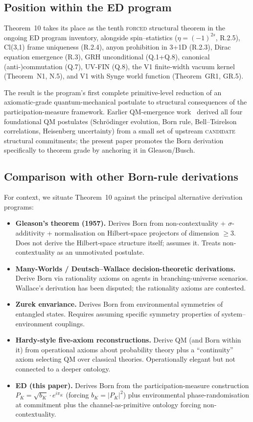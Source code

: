 \documentclass[11pt,a4paper]{article}
\begin{document}
\subsection{Position within the ED program}

Theorem~10 takes its place as the tenth \textsc{forced} structural theorem in the ongoing ED program inventory, alongside spin--statistics ($\eta = (-1)^{2s}$, R.2.5), Cl(3,1) frame uniqueness (R.2.4), anyon prohibition in 3+1D (R.2.3), Dirac equation emergence (R.3), GRH unconditional (Q.1+Q.8), canonical (anti-)commutation (Q.7), UV-FIN (Q.8), the V1 finite-width vacuum kernel (Theorem~N1, N.5), and V1 with Synge world function (Theorem~GR1, GR.5).

The result is the program's first complete primitive-level reduction of an axiomatic-grade quantum-mechanical postulate to structural consequences of the participation-measure framework. Earlier QM-emergence work~\cite{phase1} derived all four foundational QM postulates (Schr\"odinger evolution, Born rule, Bell--Tsirelson correlations, Heisenberg uncertainty) from a small set of upstream \textsc{candidate} structural commitments; the present paper promotes the Born derivation specifically to theorem grade by anchoring it in Gleason/Busch.

\subsection{Comparison with other Born-rule derivations}

For context, we situate Theorem~10 against the principal alternative derivation programs:

\begin{itemize}
  \item \textbf{Gleason's theorem (1957).} Derives Born from non-contextuality + $\sigma$-additivity + normalisation on Hilbert-space projectors of dimension $\geq 3$. Does not derive the Hilbert-space structure itself; assumes it. Treats non-contextuality as an unmotivated postulate.
  \item \textbf{Many-Worlds / Deutsch--Wallace decision-theoretic derivations.} Derive Born via rationality axioms on agents in branching-universe scenarios. Wallace's derivation has been disputed; the rationality axioms are contested.
  \item \textbf{Zurek envariance.} Derives Born from environmental symmetries of entangled states. Requires assuming specific symmetry properties of system--environment couplings.
  \item \textbf{Hardy-style five-axiom reconstructions.} Derive QM (and Born within it) from operational axioms about probability theory plus a ``continuity'' axiom selecting QM over classical theories. Operationally elegant but not connected to a deeper ontology.
  \item \textbf{ED (this paper).} Derives Born from the participation-measure construction $P_K = \sqrt{b_K} \cdot e^{i \pi_K}$ (forcing $b_K = |P_K|^2$) plus environmental phase-randomisation at commitment plus the channel-as-primitive ontology forcing non-contextuality.
\end{itemize}
\end{document}
